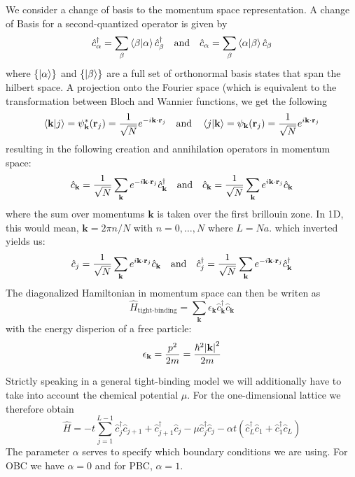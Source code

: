 \documentclass[11pt, a4paper]{article}
\theoremstyle{definition} %
\begin{document}
We consider a change of basis to the momentum space representation. A change of Basis for a second-quantized operator is given by
\begin{equation}
	\hat{c}_\alpha^\dagger = \sum_\beta \braket{\beta}{\alpha} \hat{c}_\beta^\dagger \qq{and} \hat{c}_\alpha = \sum_\beta \braket{\alpha}{\beta} \hat{c}_\beta
\end{equation}
where $\{\ket{\alpha} \}$ and $\{\ket{\beta}\}$ are a full set of orthonormal basis states that span the hilbert space. A projection
onto the Fourier space (which is equivalent to the transformation between Bloch and Wannier functions, we get the following
\begin{equation}
	\braket{\mathbf{k}}{j} = \psi_{\mathbf{k}}^*(\mathbf{r}_j) = \frac{1}{\sqrt{N}} e^{-i \mathbf{k} \cdot \mathbf{r}_j} \qq{and} \braket{j}{\mathbf{k}} = \psi_\mathbf{k}(\mathbf{r}_j) = \frac{1}{\sqrt{N}} e^{i \mathbf{k} \cdot \mathbf{r}_j}
\end{equation}
resulting in the following creation and annihilation operators in momentum space:
\begin{equation}
	\hat{c}_{\mathbf{k}} = \frac{1}{\sqrt{N}}  \sum_{\mathbf{k}} e^{-i \mathbf{k}\cdot \mathbf{r}_j} \hat{c}_{\mathbf{k}}^\dagger \qq{and} \hat{c}_\mathbf{k} = \frac{1}{\sqrt{N}} \sum_\mathbf{k} e^{i \mathbf{k} \cdot \mathbf{r}_j} \hat{c}_\mathbf{k}
\end{equation}
where the sum over momentums $\mathbf{k}$ is taken over the first brillouin zone. In 1D, this would mean, $\mathbf{k} = 2\pi n/ N$ with $n = 0, \dots, N$ where $L = Na$.
which inverted yields us:
\begin{equation}
	\hat{c}_j = \frac{1}{\sqrt{N}} \sum_{\mathbf{k}} e^{i \mathbf{k}\cdot \mathbf{r}_j} \hat{c}_\mathbf{k} \qq{and} \hat{c}_j^\dagger = \frac{1}{\sqrt{N}} \sum_{\mathbf{k}} e^{-i\mathbf{k}\cdot \mathbf{r}_j} \hat{c}_\mathbf{k}^\dagger
\end{equation}
The diagonalized Hamiltonian in momentum space can then be writen as
\begin{equation}
	\hat{H}_{\text{tight-binding}} = \sum_{\mathbf{k}} \epsilon_{\mathbf{k}} \hat{c}_{\mathbf{k}}^\dagger \hat{c}_{\mathbf{k}}
\end{equation}
with the energy disperion of a free particle:
\begin{equation}
	\epsilon_{\mathbf{k}} = \frac{p^2}{2m} = \frac{\hbar^2 \abs{\mathbf{k}}^2}{2m}
\end{equation}

Strictly speaking in a general tight-binding model we will additionally have to take into account the chemical potential $\mu$. For the one-dimensional lattice we therefore obtain
\begin{equation}
	\hat{H} = - t \sum_{j=1}^{L-1} \hat{c}_j^\dagger \hat{c}_{j+1} + \hat{c}_{j + 1}^\dagger \hat{c}_j - \mu \hat{c}_j^\dagger \hat{c}_j - \alpha t( \hat{c}_{L}^\dagger \hat{c}_1 + \hat{c}_1^\dagger \hat{c}_L)
\end{equation}
The parameter $\alpha$ serves to specify which boundary conditions we are using. For OBC we have $\alpha = 0$ and for PBC, $\alpha = 1$.  \\
\end{document}
